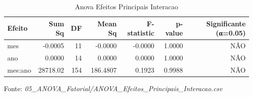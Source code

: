 \begin{table}[H]
\centering
\small
\caption{Anova Efeitos Principais Interacao}
\label{tab:07_05_ANOVA_Fatorial}
\begin{tabular}{|l|r|r|r|r|r|r|}
\hline
\textbf{Efeito} & \textbf{Sum Sq} & \textbf{DF} & \textbf{Mean Sq} & \textbf{F-statistic} & \textbf{p-value} & \textbf{Significante (α=0.05)} \\
\hline
mes & -0.0005 & 11 & -0.0000 & -0.0000 & 1.0000 & NÃO \\
ano & 0.0000 & 14 & 0.0000 & 0.0000 & 1.0000 & NÃO \\
mes:ano & 28718.02 & 154 & 186.4807 & 0.1923 & 0.9988 & NÃO \\
\hline
\end{tabular}
\begin{flushleft}
\small Fonte: \textit{05_ANOVA_Fatorial/ANOVA_Efeitos_Principais_Interacao.csv}
\end{flushleft}
\end{table}
